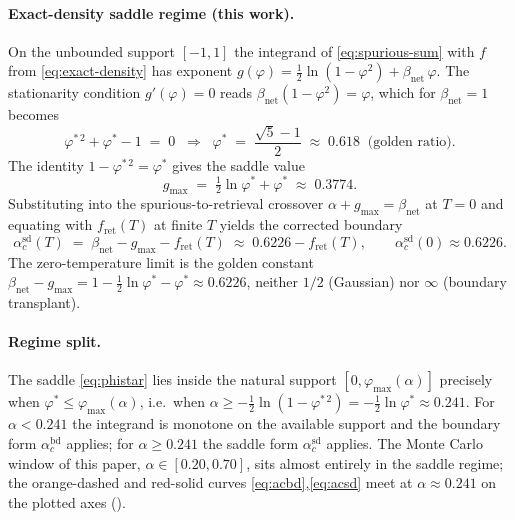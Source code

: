 \documentclass[11pt]{article}
\newcommand{\Bnet}{\beta_{\mathrm{net}}}
\newcommand{\fret}{f_{\mathrm{ret}}}
\newcommand{\acBd}{\alpha_c^{\mathrm{bd}}}
\newcommand{\acSd}{\alpha_c^{\mathrm{sd}}}
\begin{document}
\paragraph{Exact-density saddle regime (this work).}
\label{sec:formulas:saddle}
On the unbounded support $[-1,1]$ the integrand of \eqref{eq:spurious-sum}
with $f$ from \eqref{eq:exact-density} has exponent
$g(\varphi) = \tfrac12 \ln(1-\varphi^2) + \Bnet\,\varphi$. The stationarity
condition $g'(\varphi)=0$ reads $\Bnet(1-\varphi^2) = \varphi$, which for
$\Bnet = 1$ becomes
\begin{equation}
\varphi^{*\,2} + \varphi^{*} - 1 \;=\; 0
\;\;\Longrightarrow\;\;
\varphi^{*} \;=\; \frac{\sqrt{5}-1}{2} \;\approx\; 0.618 \;\; \text{(golden ratio).}
\label{eq:phistar}
\end{equation}
The identity $1 - \varphi^{*\,2} = \varphi^{*}$ gives the saddle value
\begin{equation}
g_{\max} \;=\; \tfrac12 \ln \varphi^{*} + \varphi^{*}
        \;\approx\; 0.3774.
\label{eq:gmax}
\end{equation}
Substituting into the spurious-to-retrieval crossover
$\alpha + g_{\max} = \Bnet$ at $T=0$ and equating with $\fret(T)$ at
finite $T$ yields the corrected boundary
\begin{equation}
\boxed{\;
\acSd(T) \;=\; \Bnet - g_{\max} - \fret(T) \;\approx\; 0.6226 - \fret(T),
\qquad \acSd(0) \approx 0.6226.
\;}
\label{eq:acsd}
\end{equation}
The zero-temperature limit is the golden constant
$\Bnet - g_{\max} = 1 - \tfrac12 \ln \varphi^{*} - \varphi^{*}
\approx 0.6226$, neither $1/2$ (Gaussian) nor $\infty$ (boundary
transplant).

\paragraph{Regime split.}
\label{sec:formulas:split}
The saddle \eqref{eq:phistar} lies inside the natural support
$[0,\varphi_{\max}(\alpha)]$ precisely when
$\varphi^{*} \le \varphi_{\max}(\alpha)$, i.e.\ when
$\alpha \ge -\tfrac12 \ln(1-\varphi^{*\,2}) = -\tfrac12 \ln \varphi^{*}
\approx 0.241$. For $\alpha < 0.241$ the integrand is monotone on the
available support and the boundary form $\acBd$ applies; for
$\alpha \ge 0.241$ the saddle form $\acSd$ applies. The Monte Carlo
window of this paper, $\alpha \in [0.20, 0.70]$, sits almost entirely in
the saddle regime; the orange-dashed and red-solid curves
\eqref{eq:acbd},\eqref{eq:acsd} meet at $\alpha \approx 0.241$ on the
plotted axes ().
\end{document}
